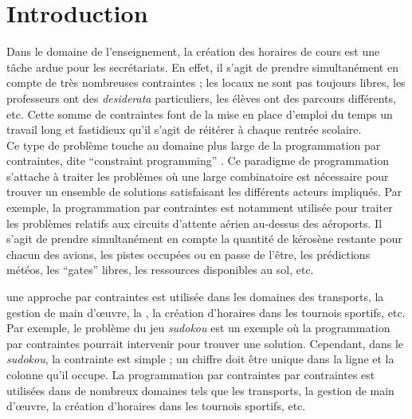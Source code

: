 

\chapter*{Introduction}

Dans le domaine de l'enseignement, la création des horaires de cours est une tâche ardue pour les secrétariats. En effet, il s'agit de prendre simultanément en compte de très nombreuses contraintes ; les locaux ne sont pas toujours libres, les professeurs ont des \textit{desiderata} particuliers, les élèves ont des parcours différents, etc. Cette somme de contraintes font de la mise en place d'emploi du temps un travail long et fastidieux qu'il s'agit de réitérer à chaque rentrée scolaire.\\
\newline
\indent
Ce type de problème touche au domaine plus large de la programmation par contraintes, dite \enquote{constraint programming} \citep{Muller_2005}. Ce paradigme de programmation s'attache à traiter les problèmes où une large combinatoire est nécessaire pour trouver un ensemble de solutions satisfaisant les différents acteurs impliqués. Par exemple, la programmation par contraintes est notamment utilisée pour traiter les problèmes relatifs aux circuits d'attente aérien au-dessus des aéroports. Il s'agit de prendre simultanément en compte la quantité de kérosène restante pour chacun des avions, les pistes occupées ou en passe de l'être, les prédictions météos, les \enquote{gates} libres, les ressources disponibles au sol, etc.
\newline
\indent


une approche par contraintes est utilisée dans les domaines des transports,  la gestion de main d’œuvre, la , la création d'horaires dans les tournois sportifs, etc.\\

  Par exemple, le problème du jeu \textit{sudokou} est un exemple où la programmation par contraintes pourrait intervenir pour trouver une solution. Cependant, dans le \textit{sudokou}, la contrainte est simple ; un chiffre doit être unique dans la ligne et la colonne qu'il occupe.
\newline
\indent
La programmation par contraintes par contraintes est utilisées dans de nombreux domaines tels que les transports, la gestion de main d’œuvre, la création d'horaires dans les tournois sportifs, etc.\\
\newline
\indent

